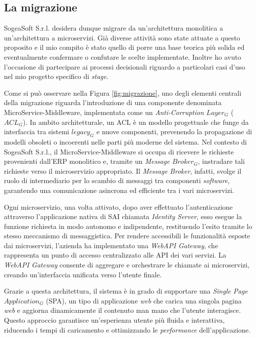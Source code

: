         \subsection{La migrazione}
        SogeaSoft S.r.l. desidera dunque migrare da un'architettura monolitica a un'architettura a microservizi. Già diverse attività sono state attuate a questo proposito e il mio compito è stato quello di porre una base teorica più solida ed eventualmente confermare o confutare le scelte implementate. Inoltre ho avuto l'occasione di partecipare ai processi decisionali riguardo a particolari casi d'uso nel mio progetto specifico di \textit{stage}. 

        \vspace{0.2 em}
        \noindent Come si può osservare nella Figura \ref{fig:migrazione}, uno degli elementi centrali della migrazione riguarda l'introduzione di una componente denominata MicroService-Middleware, implementata come un \textit{Anti-Corruption $Layer_G$} ($ACL_G$). In ambito architetturale, un ACL è un modello progettuale che funge da interfaccia tra sistemi $legacy_G$ e nuove componenti, prevenendo la propagazione di modelli obsoleti o incoerenti nelle parti più moderne del sistema. Nel contesto di SogeaSoft S.r.l., il MicroService-Middleware si occupa di ricevere le richieste provenienti dall'ERP monolitico e, tramite un \textit{Message $Broker_G$}, instradare tali richieste verso il microservizio appropriato. Il \textit{Message Broker}, infatti, svolge il ruolo di intermediario per lo scambio di messaggi tra componenti \textit{software}, garantendo una comunicazione asincrona ed efficiente tra i vari microservizi.  

        \vspace{0.2 em}
        \noindent Ogni microservizio, una volta attivato, dopo aver effettuato l'autenticazione attraverso l'applicazione nativa di SAI chiamata \textit{Identity Server}, esso esegue la funzione richiesta in modo autonomo e indipendente, restituendo l’esito tramite lo stesso meccanismo di messaggistica. Per rendere accessibili le funzionalità esposte dai microservizi, l'azienda ha implementato una \textit{WebAPI Gateway}, che rappresenta un punto di accesso centralizzato alle API dei vari servizi. La \textit{WebAPI Gateway} consente di aggregare e orchestrare le chiamate ai microservizi, creando un'interfaccia unificata verso l'utente finale.  

        \vspace{0.2 em}
        \noindent Grazie a questa architettura, il sistema è in grado di supportare una \textit{Single Page $Application_G$} (SPA), un tipo di applicazione \textit{web} che carica una singola pagina \textit{web} e aggiorna dinamicamente il contenuto man mano che l'utente interagisce. Questo approccio garantisce un'esperienza utente più fluida e interattiva, riducendo i tempi di caricamento e ottimizzando le \textit{performance} dell'applicazione.  

